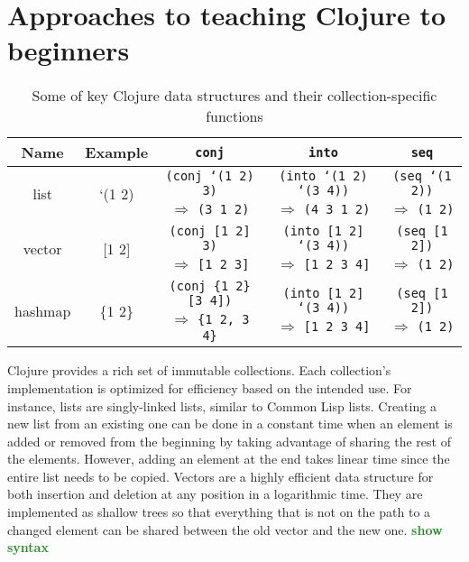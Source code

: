 \documentclass[submission,copyright,creativecommons]{eptcs}
\newcommand{\allcomments}[1]{{#1}}
\newcommand{\elenacomment}[1]{{\bf \textcolor{ForestGreen}{\allcomments{{#1}}}}}
\newcommand{\todo}[1]{{\bf \color{magenta}{\allcomments{ To-do: {#1}}}}}
\begin{document}

\section{Approaches to teaching Clojure to beginners}\label{sec:approaches}
\begin{table}[t]
\centering
\begin{tabular}{|c|c|c|c|c|}
\hline
Name & Example & {\tt conj} &  {\tt into} & {\tt seq} \\
\hline
list & `(1 2) & {\parbox{3.5cm}{{\tt (conj `(1 2) 3)} \\ $\Rightarrow$ {\tt (3 1 2)}}} & 
{\parbox{4.2cm}{{\tt (into `(1 2) `(3 4))} \\ $\Rightarrow$ {\tt (4 3 1 2)}}} &
{\parbox{3cm}{{\tt (seq `(1 2))} \\ $\Rightarrow$ {\tt (1 2)}}}
\\
\hline
vector & [1 2] & {\parbox{3.5cm}{{\tt (conj [1 2] 3)} \\ $\Rightarrow$ {\tt [1 2 3]}}} & 
{\parbox{4.2cm}{{\tt (into [1 2] `(3 4))} \\ $\Rightarrow$ {\tt [1 2 3 4]}}} &
{\parbox{3cm}{{\tt (seq [1 2])} \\ $\Rightarrow$ {\tt (1 2)}}} \\
\hline
hashmap & \{1 2\} & {\parbox{3.5cm}{{\tt (conj \{1 2\} [3 4])} \\ $\Rightarrow$ {\tt \{1 2, 3 4\}}}} & 
{\parbox{4.2cm}{{\tt (into [1 2] `(3 4))} \\ $\Rightarrow$ {\tt [1 2 3 4]}}} &
{\parbox{3cm}{{\tt (seq [1 2])} \\ $\Rightarrow$ {\tt (1 2)}}} \\
\hline
\end{tabular}
\caption{Some of key Clojure data structures and their collection-specific functions}\label{table:data-structures}
\end{table}
Clojure provides a rich set of immutable collections. Each collection's  implementation  is optimized for efficiency based on the intended use. 
For instance, lists are singly-linked lists, similar to Common Lisp lists. Creating a new list from an existing one can be done in a constant time when an element is added or removed from the beginning by taking advantage of sharing the rest of the elements. %
However, adding an element at the end takes linear time since the entire list needs to be copied. 
Vectors are a highly efficient data structure for both insertion and deletion at any position in a logarithmic time.
They are implemented as shallow trees so that everything that is not on the path to a changed element can be shared between the old vector and the new one.
\elenacomment{show syntax}
\end{document}

